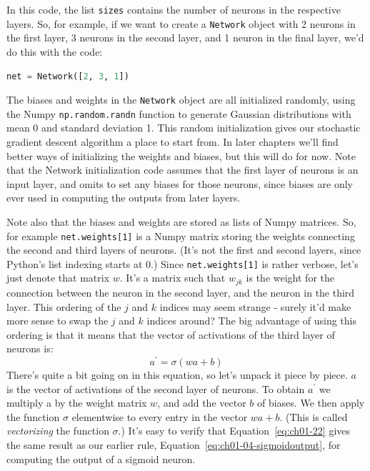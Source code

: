 In this code, the list \lstinline{sizes} contains the number of neurons in the respective layers. So, for example, if we want to create a \lstinline{Network} object with 2 neurons in the first layer, 3 neurons in the second layer, and 1 neuron in the final layer, we'd do this with the code: 
\begin{lstlisting}[language=Python]
net = Network([2, 3, 1])
\end{lstlisting}
The biases and weights in the \lstinline{Network} object are all initialized randomly, using the Numpy \lstinline{np.random.randn} function to generate Gaussian distributions with mean 0 and standard deviation 1. This random initialization gives our stochastic gradient descent algorithm a place to start from. In later chapters we'll find better ways of initializing the weights and biases, but this will do for now. Note that the Network initialization code assumes that the first layer of neurons is an input layer, and omits to set any biases for those neurons, since biases are only ever used in computing the outputs from later layers.

Note also that the biases and weights are stored as lists of Numpy matrices. So, for example \lstinline{net.weights[1]} is a Numpy matrix storing the weights connecting the second and third layers of neurons. (It's not the first and second layers, since Python's list indexing starts at 0.) Since \lstinline{net.weights[1]} is rather verbose, let's just denote that matrix $w$. It's a matrix such that $w_{jk}$ is the weight for the connection between the  neuron in the second layer, and the  neuron in the third layer. This ordering of the $j$ and $k$ indices may seem strange - surely it'd make more sense to swap the $j$ and $k$ indices around? The big advantage of using this ordering is that it means that the vector of activations of the third layer of neurons is: 
\begin{equation}
a^{\prime}=\sigma(w a+b)
\label{eq:ch01-22}
\end{equation}
There's quite a bit going on in this equation, so let's unpack it piece by piece. $a$ is the vector of activations of the second layer of neurons. To obtain $a^\prime$ we multiply a by the weight matrix $w$, and add the vector $b$ of biases. We then apply the function $\sigma$ elementwise to every entry in the vector $wa+b$. (This is called \textit{vectorizing} the function $\sigma$.) It's easy to verify that Equation~\ref{eq:ch01-22} gives the same result as our earlier rule, Equation~\ref{eq:ch01-04-sigmoidoutput}, for computing the output of a sigmoid neuron.


